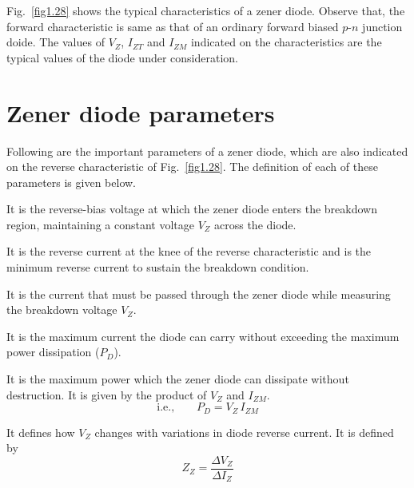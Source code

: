 Fig.~\ref{fig1.28} shows the typical characteristics of a zener diode. Observe that, the forward characteristic is same as that of an ordinary forward biased $p$-$n$ junction doide. The values of $V_{Z}$, $I_{ZT}$ and $I_{ZM}$ indicated on the characteristics are the typical values of the diode under consideration.

\section{Zener diode parameters}\label{sec1.24}

Following are the important parameters of a zener diode, which are also indicated on the reverse characteristic of Fig.~\ref{fig1.28}. The definition of each of these parameters is given below.

\medskip
{}

\smallskip
It is the reverse-bias voltage at which the zener diode enters the breakdown region, maintaining a constant voltage $V_{Z}$ across the diode.

\medskip
{}

\smallskip
It is the reverse current at the knee of the reverse characteristic and is the minimum reverse current to sustain the breakdown condition.

\medskip
{}

\smallskip
It is the current that must be passed through the zener diode while measuring the breakdown voltage $V_{Z}$.

\medskip
{}

\smallskip
It is the maximum current the diode can carry without exceeding the maximum power dissipation ($P_{D}$).

\medskip
{}

\smallskip
It is the maximum power which the zener diode can dissipate without destruction. It is given by the product of $V_{Z}$ and $I_{ZM}$.
\begin{equation}
\text{i.e.,}\qquad P_{D}=V_{Z}\,I_{ZM}
\end{equation}

\medskip
{}

\smallskip
It defines how $V_{Z}$ changes with variations in diode reverse current. It is defined by
\begin{equation}
Z_{Z}=\dfrac{\Delta V_{Z}}{\Delta I_{Z}}
\end{equation}

